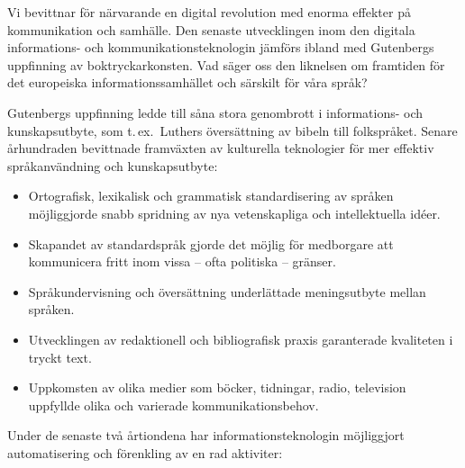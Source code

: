 \begin{multicols}{2}

Vi bevittnar för närvarande en digital revolution med enorma effekter
på kommunikation och samhälle. Den senaste utvecklingen inom den
digitala informations- och kommunika\-tions\-teknologin jämförs ibland
med Gutenbergs uppfinning av bok\-tryckar\-konsten. Vad säger oss den
liknelsen om fram\-tiden för det europeiska informations\-samhället
och särskilt för våra språk?


Gutenbergs uppfinning ledde till såna stora genombrott i informations-
och kunskaps\-utbyte, som t.\,ex.~Luthers översättning av bibeln till
folkspråket. Senare århundraden bevittnade framväxten av kulturella
teknologier för mer effektiv språkanvändning och kunskapsutbyte:

\medskip
\begin{itemize}
\item Ortografisk, lexikalisk och grammatisk standardisering av
  språken möjliggjorde snabb spridning av nya vetenskapliga och
  intellektuella idéer.
\item Skapandet av standardspråk gjorde det möjlig för medborgare att
  kommunicera fritt inom vissa -- ofta politiska -- gränser.
\item Språkundervisning och översättning underlättade meningsutbyte
  mellan språken.
\item Utvecklingen av redaktionell och bibliografisk praxis
  garanterade kvaliteten i tryckt text.
\item Uppkomsten av olika medier som böcker, tidningar, radio,
  television uppfyllde olika och varierade kommunikationsbehov.
\end{itemize}

Under de senaste två årtiondena har informations\-teknologin
möjliggjort automatisering och förenkling av en rad aktiviter:


\end{multicols}
